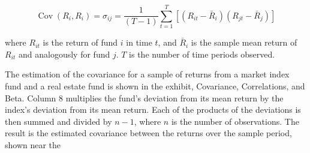 \documentclass[11pt]{article}
\begin{document}
\begin{equation*}
\operatorname{Cov}\left(R_{i}, R_{i}\right)=\sigma_{i j}=\frac{1}{(T-1)} \sum_{t=1}^{T}\left[\left(R_{i t}-\bar{R}_{i}\right)\left(R_{j t}-\bar{R}_{j}\right)\right] \tag{2}
\end{equation*}


where $R_{i t}$ is the return of fund $i$ in time $t$, and $\bar{R}_{i}$ is the sample mean return of $R_{i t}$ and analogously for fund $j$. $T$ is the number of time periods observed.

The estimation of the covariance for a sample of returns from a market index fund and a real estate fund is shown in the exhibit, Covariance, Correlations, and Beta. Column 8 multiplies the fund's deviation from its mean return by the index's deviation from its mean return. Each of the products of the deviations is then summed and divided by $n-1$, where $n$ is the number of observations. The result is the estimated covariance between the returns over the sample period, shown near the
\end{document}
